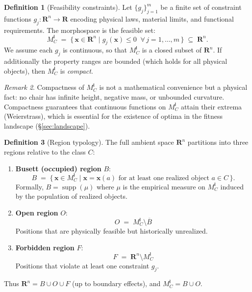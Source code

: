 \documentclass[10pt]{article}
\theoremstyle{definition}
\newtheorem{definition}{Definition}[section]
\theoremstyle{plain}
\theoremstyle{remark}
\newtheorem{remark}[definition]{Remark}
\newcommand{\MC}{M^{\mathsf{I}}_C}          %
\providecommand{\Rn}{}
\renewcommand{\Rn}{\mathbf{R}^n}            %
\providecommand{\R}{}
\renewcommand{\R}{\mathbf{R}}               %
\DeclareMathOperator{\supp}{supp}
\begin{document}
\begin{definition}[Feasibility constraints]\label{def:1.2}
Let $\{g_j\}_{j=1}^{m}$ be a finite set of constraint functions
$g_j : \Rn \to \R$ encoding physical laws, material limits, and
functional requirements. The morphospace is the feasible set:
\[
  \MC \;=\; \bigl\{\, \bm{x} \in \Rn
    \;\big|\; g_j(\bm{x}) \leq 0 \;\;\forall\, j = 1, \ldots, m
  \,\bigr\} \;\subseteq\; \Rn.
\]
We assume each $g_j$ is continuous, so that $\MC$ is a closed subset
of\/ $\Rn$. If additionally the property ranges are bounded (which holds
for all physical objects), then $\MC$ is \emph{compact}.
\end{definition}

\begin{remark}
Compactness of\/ $\MC$ is not a mathematical convenience but a physical
fact: no chair has infinite height, negative mass, or unbounded curvature.
Compactness guarantees that continuous functions on $\MC$ attain their
extrema (Weierstrass), which is essential for the existence of optima in
the fitness landscape (\S\ref{sec:landscape}).
\end{remark}

\begin{definition}[Region typology]\label{def:1.3}
The full ambient space $\Rn$ partitions into three regions relative to
the class $C$:
\begin{enumerate}[label=(\roman*),nosep]
  \item \textbf{Busett (occupied) region} $B$:
    \[
      B \;=\; \bigl\{\, \bm{x} \in \MC
        \;\big|\; \bm{x} = \bm{x}(a) \text{ for at least one
        realized object } a \in C \,\bigr\}.
    \]
    Formally, $B = \supp(\mu)$ where $\mu$ is the empirical measure
    on $\MC$ induced by the population of realized objects.

  \item \textbf{Open region} $O$:
    \[
      O \;=\; \MC \setminus \overline{B}
    \]
    Positions that are physically feasible but historically unrealized.

  \item \textbf{Forbidden region} $F$:
    \[
      F \;=\; \Rn \setminus \MC
    \]
    Positions that violate at least one constraint $g_j$.
\end{enumerate}
Thus $\Rn = B \cup O \cup F$ (up to boundary effects), and
$\MC = B \cup O$.
\end{definition}
\end{document}
